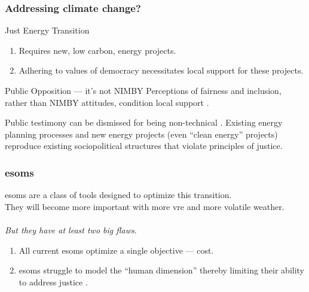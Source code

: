 \begin{frame}
    \frametitle{Addressing climate change?}

        \begin{block}{Just Energy Transition}
            \begin{enumerate}
                \item Requires new, low carbon, energy projects.
                \item Adhering to values of democracy necessitates local support
                for these projects.
            \end{enumerate}
        \end{block}
        \begin{block}{Public Opposition --- it's not NIMBY}
            Perceptions of fairness and inclusion, rather than NIMBY attitudes,
            condition local support
            \cite{konisky_proximity_2021,aitken_why_2010,stokes_prevalence_2023,firestone_public_2012-1}.
        \end{block}
        \begin{block}{}
            Public testimony can be dismissed for being non-technical
            \cite{johnson_dakota_2021}. Existing energy planning processes and
            new energy projects (even ``clean energy'' projects) reproduce
            existing sociopolitical structures that violate principles of
            justice.
        \end{block}
\end{frame}

\begin{frame}
    \frametitle{\glspl{esom}}
    \Glspl{esom} are a class of tools designed to 
    optimize this transition.
    \\

    They will become more important with more \gls{vre}
    and more volatile weather.
    \\\\
    \textit{But they have at least two big flaws}.
    \begin{enumerate}[<+->]
        \item All current \glspl{esom} optimize a single objective --- cost.
        \item \glspl{esom} struggle to model the ``human dimension'' thereby
        limiting their ability to address justice \cite{pfenninger_energy_2014}.
    \end{enumerate}
\end{frame}

